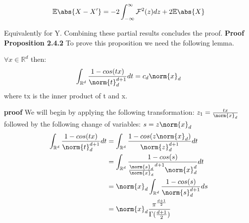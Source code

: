 $$
\mathbb{E}\abs{X-X'} =  -2\int_{-\infty}^{\infty}\mathcal{F}^{2}(z)dz + 2\mathbb{E}\abs{X}
$$

Equivalently for Y. Combining these partial results concludes the proof.
\newpage
\textbf{Proof Proposition 2.4.2}
To prove this proposition we need the following lemma.
\begin{lem}
$\forall x \in \mathbb{R}^{d}$ then:
\vspace{5mm}
$$\int_{\mathbb{R}^{d}}\frac{1-cos(tx)}{\norm{t}^{d+1}_{d}} dt = c_{d}\norm{x}_{d}$$
where tx is the inner product of t and x. \label{cd}
\end{lem}
\textbf{proof}
We will begin by applying the following transformation: $z_{1} = \frac{tx}{\norm{x}_{d}}$
followed by the following change of variables:
$s = z\norm{x}_{d}$
\begin{equation}{}
\begin{split}
\int_{\mathbb{R}^{d}}\frac{1-cos(tx)}{\norm{t}^{d+1}_{d}} dt 
&= \int_{\mathbb{R}^{d}}\frac{1-cos(z\norm{x}_{d})}{\norm{z}^{d+1}_{d}} dt \\
&= \int_{\mathbb{R}^{d}}\frac{1-cos(s)}{\frac{\norm{s}_{d}}{\norm{x}_{d}}^{d+1} \norm{x}^{d}_{d}} dt \\
&=\norm{x}_{d}\int_{\mathbb{R}^{d}}\frac{1-cos(s)}{\norm{s}^{d+1}_{d}}ds \\
&=\norm{x}_{d}\frac{\pi^{\frac{d+1}{2}}}{\Gamma(\frac{d+1}{2})}
\end{split}
\end{equation}

